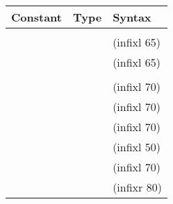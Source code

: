 %
\begin{isabellebody}%
\def\isabellecontext{appendix}%
%
\begin{isamarkuptext}%
\begin{table}[htbp]
\begin{center}
\begin{tabular}{lll}
Constant & Type & Syntax \\
\hline
\isa{{\isadigit{0}}} & \isa{{\isacharprime}a{\isacharcolon}{\isacharcolon}zero} \\
\isa{{\isacharplus}} & \isa{{\isacharparenleft}{\isacharprime}a{\isacharcolon}{\isacharcolon}plus{\isacharparenright}\ {\isasymRightarrow}\ {\isacharprime}a\ {\isasymRightarrow}\ {\isacharprime}a} & (infixl 65) \\
\isa{{\isacharminus}} & \isa{{\isacharparenleft}{\isacharprime}a{\isacharcolon}{\isacharcolon}minus{\isacharparenright}\ {\isasymRightarrow}\ {\isacharprime}a\ {\isasymRightarrow}\ {\isacharprime}a} &  (infixl 65) \\
\isa{{\isacharminus}} & \isa{{\isacharparenleft}{\isacharprime}a{\isacharcolon}{\isacharcolon}minus{\isacharparenright}\ {\isasymRightarrow}\ {\isacharprime}a} \\
\isa{{\isacharasterisk}} & \isa{{\isacharparenleft}{\isacharprime}a{\isacharcolon}{\isacharcolon}times{\isacharparenright}\ {\isasymRightarrow}\ {\isacharprime}a\ {\isasymRightarrow}\ {\isacharprime}a} & (infixl 70) \\
\isa{div} & \isa{{\isacharparenleft}{\isacharprime}a{\isacharcolon}{\isacharcolon}div{\isacharparenright}\ {\isasymRightarrow}\ {\isacharprime}a\ {\isasymRightarrow}\ {\isacharprime}a} & (infixl 70) \\
\isa{mod} & \isa{{\isacharparenleft}{\isacharprime}a{\isacharcolon}{\isacharcolon}div{\isacharparenright}\ {\isasymRightarrow}\ {\isacharprime}a\ {\isasymRightarrow}\ {\isacharprime}a} & (infixl 70) \\
\isa{dvd} & \isa{{\isacharparenleft}{\isacharprime}a{\isacharcolon}{\isacharcolon}times{\isacharparenright}\ {\isasymRightarrow}\ {\isacharprime}a\ {\isasymRightarrow}\ bool} & (infixl 50) \\
\isa{{\isacharslash}}  & \isa{{\isacharparenleft}{\isacharprime}a{\isacharcolon}{\isacharcolon}inverse{\isacharparenright}\ {\isasymRightarrow}\ {\isacharprime}a\ {\isasymRightarrow}\ {\isacharprime}a} & (infixl 70) \\
\isa{{\isacharcircum}} & \isa{{\isacharparenleft}{\isacharprime}a{\isacharcolon}{\isacharcolon}power{\isacharparenright}\ {\isasymRightarrow}\ nat\ {\isasymRightarrow}\ {\isacharprime}a} & (infixr 80) \\

\end{tabular}
\end{center}
\end{table}
\end{isamarkuptext}
\end{isabellebody}
